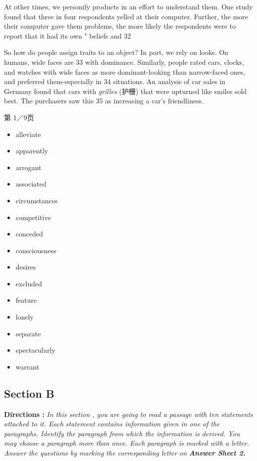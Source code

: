 \documentclass[UTF8,11pt]{ctexart}
\begin{document}
At other times, we personify products in an effort to understand them. One study found that three in four respondents yelled at their computer. Further, the more their computer gave them problems, the more likely the respondents were to report that it had its own " beliefs and 32


So how do people assign traits to an object? In part, we rely on looks. On humans, wide faces are 33 with dominance. Similarly, people rated cars, clocks, and watches with wide faces as more dominant-looking than narrow-faced ones, and preferred them-especially in 34 situations. An analysis of car sales in Germany found that cars with \textit{grilles }(护栅) that were upturned like smiles sold best. The purchasers saw this 35 as increasing a car's friendliness.


第 1／9页


\begin{itemize}[leftmargin=2em,itemsep=.2em,topsep=.4em]\item[A.] alleviate
\item[B.] apparently
\item[C.] arrogant
\item[D.] associated
\item[E.] circumstances
\item[F.] competitive
\item[G.] conceded
\item[H.] consciousness
\item[I.] desires
\item[J.] excluded
\item[K.] feature
\item[L.] lonely
\item[M.] separate
\item[N.] spectacularly
\item[O.] warrant
\end{itemize}

\subsection*{\textbf{Section B}}


\textbf{Directions : }\textit{In this section , you are going to read a passage with ten statements attached to it. Each} \textit{statement contains information given in one of the paragraphs. Identify the paragraph from} \textit{which the information is derived. You may choose a paragraph more than once. Each} \textit{paragraph is marked with a letter. Answer the questions by marking the corresponding letter} \textit{on }\textbf{\textit{Answer Sheet 2.}}
\end{document}

